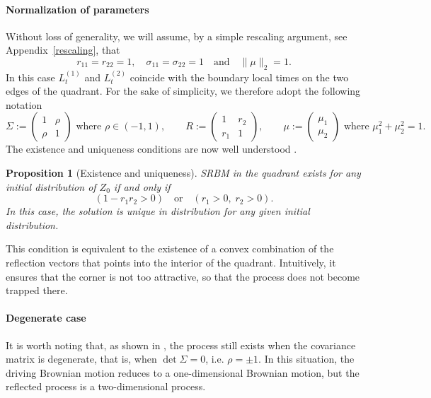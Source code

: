 \documentclass[11pt]{article}
\newtheorem{prop}[thm]{Proposition}
\theoremstyle{definition}
\begin{document}
\paragraph{Normalization of parameters}
Without loss of generality, we will assume, by a simple rescaling argument, see Appendix~\ref{rescaling}, that 
\[ r_{11} = r_{22} = 1, \quad \sigma_{11}=\sigma_{22}=1 \quad \text{and} \quad \|\mu\|_2=1.\]
In this case \( L_t^{(1)} \) and \( L_t^{(2)} \) coincide with the boundary local times on the two edges of the quadrant.
For the sake of simplicity, we therefore adopt the following notation
\[
\Sigma :=
\begin{pmatrix}
1 & \rho\\
\rho & 1
\end{pmatrix} \text{ where } \rho\in(-1,1),
\qquad
R :=
\begin{pmatrix}
1 & r_2 \\
r_1 & 1
\end{pmatrix},
\qquad
\mu := \begin{pmatrix}
\mu_1 \\
\mu_2
\end{pmatrix} \text{ where } \mu_1^2+\mu_2^2=1.
\]
The existence and uniqueness conditions are now well understood \cite{reiman_boundary_1988,taylor_existence_1993}.
\begin{prop}[Existence and uniqueness]%
SRBM in the quadrant exists for any initial distribution of $Z_0$ if and only if
\begin{equation}
\label{intro:existence}
(%
1 - r_1 r_2 > 0 ) 
\quad \text{or} \quad 
(%
r_1>0,\; r_2>0).
\end{equation}
In this case, the solution is unique in distribution for any given initial distribution.
\end{prop}
This condition is equivalent to the existence of a convex combination of the reflection vectors that points into the interior of the quadrant. 
Intuitively, it ensures that the corner is not too attractive, so that the process does not become trapped there.

\paragraph{Degenerate case}
It is worth noting that, as shown in \cite{ichiba_karatzas_degenerate_22}, the process
still exists when the covariance matrix is degenerate, that is,
when $\det \Sigma = 0$, i.e. $\rho=\pm 1$. In this situation, the driving Brownian motion
reduces to a one-dimensional Brownian motion, but the reflected process is a two-dimensional process.
\end{document}
